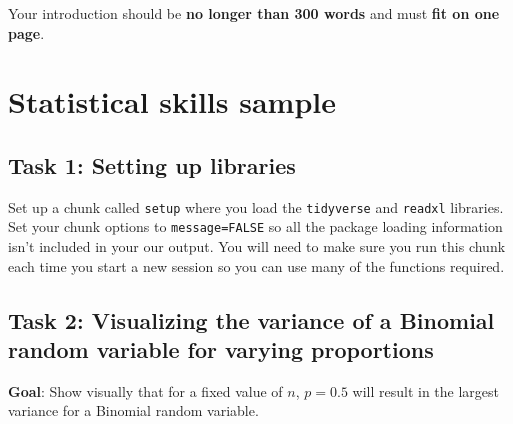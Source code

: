 \documentclass[
  openany]{book}
\begin{document}
Your introduction should be \textbf{no longer than 300 words} and must \textbf{fit on one page}.

\hypertarget{statistical-skills-sample}{%
\section{Statistical skills sample}\label{statistical-skills-sample}}

\hypertarget{task-1-setting-up-libraries}{%
\subsection{Task 1: Setting up libraries}\label{task-1-setting-up-libraries}}

Set up a chunk called \texttt{setup} where you load the \texttt{tidyverse} and \texttt{readxl} libraries. Set your chunk options to \texttt{message=FALSE} so all the package loading information isn't included in your our output. You will need to make sure you run this chunk each time you start a new session so you can use many of the functions required.

\hypertarget{task-2-visualizing-the-variance-of-a-binomial-random-variable-for-varying-proportions}{%
\subsection{Task 2: Visualizing the variance of a Binomial random variable for varying proportions}\label{task-2-visualizing-the-variance-of-a-binomial-random-variable-for-varying-proportions}}

\textbf{Goal}: Show visually that for a fixed value of \(n\), \(p=0.5\) will result in the largest variance for a Binomial random variable.
\end{document}
